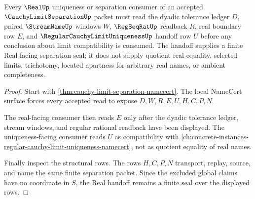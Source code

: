 \begin{theorem}
\label{thm:cauchy-limit-separation-real-handoff}
Every $\RealUp$ uniqueness or separation consumer of an accepted $\CauchyLimitSeparationUp$ packet must read the dyadic tolerance ledger $D$, paired $\StreamNameUp$ windows $W$, $\RegSeqRatUp$ readback $R$, real boundary row $E$, and $\RegularCauchyLimitUniquenessUp$ handoff row $U$ before any conclusion about limit compatibility is consumed. The handoff supplies a finite Real-facing separation seal; it does not supply quotient real equality, selected limits, trichotomy, located apartness for arbitrary real names, or ambient completeness.
\end{theorem}
\begin{proof}
Start with \autoref{thm:cauchy-limit-separation-namecert}. The local NameCert surface forces every accepted read to expose $D,W,R,E,U,H,C,P,N$.

The real-facing consumer then reads $E$ only after the dyadic tolerance ledger, stream windows, and regular rational readback have been displayed. The uniqueness-facing consumer reads $U$ as compatibility with \autoref{ch:concrete-instances-regular-cauchy-limit-uniqueness-namecert}, not as quotient equality of real names.

Finally inspect the structural rows. The rows $H,C,P,N$ transport, replay, source, and name the same finite separation packet. Since the excluded global claims have no coordinate in $S$, the Real handoff remains a finite seal over the displayed rows.
\end{proof}




